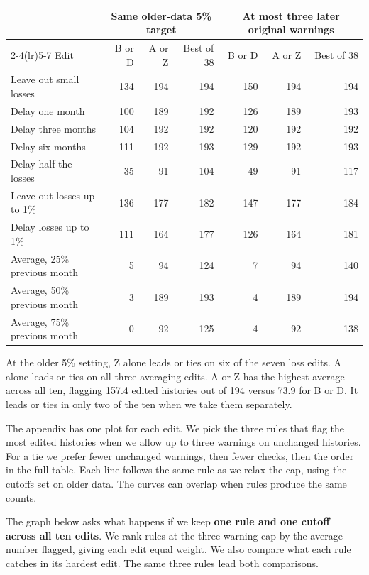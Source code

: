 \documentclass[11pt,letterpaper]{article}
\newcommand{\subhead}[1]{\vspace{3pt}{\large\bfseries #1}\par}
\begin{document}
\begin{center}
\begin{tabular}{@{}lrrrrrr@{}}\toprule
 & \multicolumn{3}{c}{Same older-data 5\% target} & \multicolumn{3}{c}{At most three later original warnings}\\
\cmidrule(lr){2-4}\cmidrule(lr){5-7}
Edit & B or D & A or Z & Best of 38 & B or D & A or Z & Best of 38\\\midrule
Leave out small losses & 134 & 194 & 194 & 150 & 194 & 194\\
Delay one month & 100 & 189 & 192 & 126 & 189 & 193\\
Delay three months & 104 & 192 & 192 & 120 & 192 & 192\\
Delay six months & 111 & 192 & 193 & 129 & 192 & 193\\
Delay half the losses & 35 & 91 & 104 & 49 & 91 & 117\\
Leave out losses up to 1\% & 136 & 177 & 182 & 147 & 177 & 184\\
Delay losses up to 1\% & 111 & 164 & 177 & 126 & 164 & 181\\
Average, 25\% previous month & 5 & 94 & 124 & 7 & 94 & 140\\
Average, 50\% previous month & 3 & 189 & 193 & 4 & 189 & 194\\
Average, 75\% previous month & 0 & 92 & 125 & 4 & 92 & 138\\
\bottomrule\end{tabular}
\end{center}

At the older 5\% setting, Z alone leads or ties on six of the seven loss edits. A alone leads or ties on all three averaging edits. A or Z has the highest average across all ten, flagging 157.4 edited histories out of 194 versus 73.9 for B or D. It leads or ties in only two of the ten when we take them separately.

\subhead{Which three lines are on each graph?}
The appendix has one plot for each edit. We pick the three rules that flag the most edited histories when we allow up to three warnings on unchanged histories. For a tie we prefer fewer unchanged warnings, then fewer checks, then the order in the full table. Each line follows the same rule as we relax the cap, using the cutoffs set on older data. The curves can overlap when rules produce the same counts.

The graph below asks what happens if we keep \textbf{one rule and one cutoff across all ten edits}. We rank rules at the three-warning cap by the average number flagged, giving each edit equal weight. We also compare what each rule catches in its hardest edit. The same three rules lead both comparisons.
\end{document}
